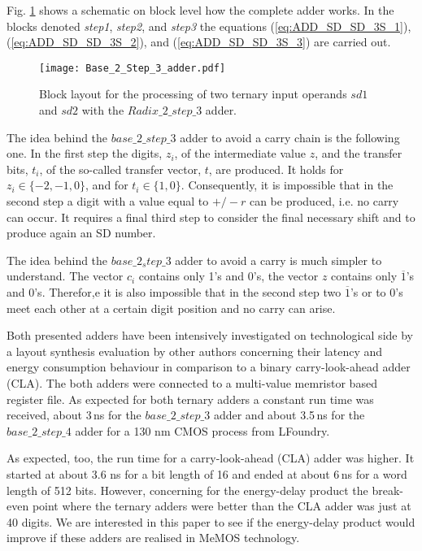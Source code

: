 \documentclass[pageno]{jpaper}
\begin{document}
Fig. \ref{fig:base_2_step_3_adder} shows a schematic on block level how the complete adder works. In the blocks denoted \textit{step1}, \textit{step2}, and \textit{step3} the equations (\ref{eq:ADD_SD_SD_3S_1}), (\ref{eq:ADD_SD_SD_3S_2}), and (\ref{eq:ADD_SD_SD_3S_3}) are carried out.

\begin{figure}[htbp]
\centering
\texttt{[image: Base\_2\_Step\_3\_adder.pdf]}
\caption{Block layout for the processing of two ternary input operands $sd1$ and $sd2$ with the $Radix\_2\_step\_3$ adder.}
\label{fig:base_2_step_3_adder}
\end{figure}

The idea behind the $base\_2\_step\_3$ adder to avoid a carry chain is the following one. In the first step the digits, $z_i$, of the intermediate value $z$, and the transfer bits, $t_i$, of the so-called transfer vector, $t$, are produced. It holds for $z_i \in \lbrace -2,-1,0 \rbrace$, and for $t_i \in  \lbrace 1,0 \rbrace$. Consequently, it is impossible that in the second step a digit with a value equal to $+/-r$ can be produced, i.e. no carry can occur. It requires a final third step to consider the final necessary shift and to produce again an SD number.

The idea behind the $base\_2_step\_3$ adder to avoid a carry is much simpler to understand. The vector $c_i$ contains only 1's and 0's, the vector $z$ contains only $\overline{1}$'s and 0's. Therefor,e it is also impossible that in the second step two $\overline{1}$'s or to 0's meet each other at a certain digit position and no carry can arise.  

Both presented adders have been intensively investigated on technological side by a layout synthesis evaluation by other authors \cite{MemSysPaper} concerning their latency and energy consumption behaviour in comparison to a binary carry-look-ahead adder (CLA). The both adders were connected to a multi-value memristor based register file. As expected for both ternary adders a constant run time was received, about 3\,ns for the $base\_2\_step\_3$ adder and about 3.5\,ns for the $base\_2\_step\_4$ adder for a 130 nm CMOS process from LFoundry.

As expected, too, the run time for a carry-look-ahead (CLA) adder was higher. It started at about 3.6 ns for a bit length of 16 and ended at about 6\,ns for a word length of 512 bits. However, concerning for the energy-delay product the break-even point where the ternary adders were better than the CLA adder was just at 40 digits. We are interested in this paper to see if the energy-delay product would improve if these adders are realised in MeMOS technology. 
\end{document}
